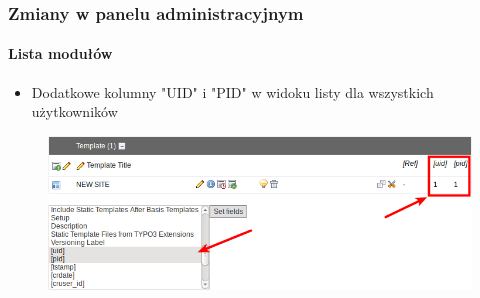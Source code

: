 
\begin{frame}[fragile]
	\frametitle{Zmiany w panelu administracyjnym}
	\framesubtitle{Lista modułów}

	\begin{itemize}
		\item Dodatkowe kolumny "UID" i "PID" w widoku listy dla wszystkich użytkowników
	\end{itemize}

	\begin{figure}
		\includegraphics[width=0.95\linewidth]{Images/BackendChanges/AdditionalColumnsInListModule.png}
	\end{figure}

\end{frame}


